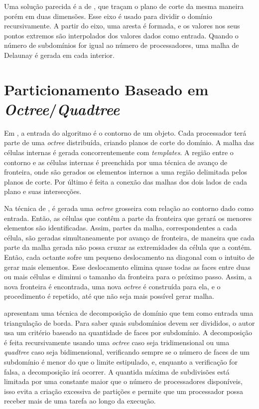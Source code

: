 Uma solução parecida é a de \cite{bib:Lammer00}, que traçam o plano de corte da mesma maneira porém em duas dimensões. Esse eixo é usado para dividir o domínio recursivamente. A partir do eixo, uma aresta é formada, e os valores nos seus pontos extremos são interpolados dos valores dados como entrada. Quando o número de subdomínios for igual ao número de processadores, uma malha de Delaunay é gerada em cada interior.

\section{Particionamento Baseado em \textit{Octree}/\textit{Quadtree}}

Em \cite{bib:deCougny99}, a entrada do algoritmo é o contorno de um objeto. Cada processador terá parte de uma \textit{octree} distribuída, criando planos de corte do domínio. A malha das células internas é gerada concorrentemente com \textit{templates}. A região entre o contorno e as células internas é preenchida por uma técnica de avanço de fronteira, onde são gerados os elementos internos a uma região delimitada pelos planos de corte. Por último é feita a conexão das malhas dos dois lados de cada plano e suas intersecções.

Na técnica de \cite{bib:Lohner01}, é gerada uma \textit{octree} grosseira com relação ao contorno dado como entrada. Então, as células que contêm a parte da fronteira que gerará os menores elementos são identificadas. Assim, partes da malha, correspondentes a cada célula, são geradas simultaneamente por avanço de fronteira, de maneira que cada parte da malha gerada não possa cruzar as extremidades da célula que a contém. Então, cada octante sofre um pequeno deslocamento na diagonal com o intuito de gerar mais elementos. Esse deslocamento elimina quase todas as faces entre duas ou mais células e diminui o tamanho da fronteira para o próximo passo. Assim, a nova fronteira é encontrada, uma nova \textit{octree} é construída para ela, e o procedimento é repetido, até que não seja mais possível gerar malha.

\cite{bib:Larwood03} apresentam uma técnica de decomposição de domínio que tem como entrada uma triangulação de borda. Para saber quais subdomínios devem ser divididos, o autor usa um critério baseado na quantidade de faces por subdomínio. A decomposição é feita recursivamente usando uma \textit{octree} caso seja tridimensional ou uma \textit{quadtree} caso seja bidimensional, verificando sempre se o número de faces de um subdomínio é menor do que o limite estipulado, e, enquanto a verificação for falsa, a decomposição irá ocorrer. A quantida máxima de subdivisões está limitada por uma constante maior que o número de processadores disponíveis, isso evita a criação excessiva de partições e permite que um processador possa receber mais de uma tarefa ao longo da execução.

